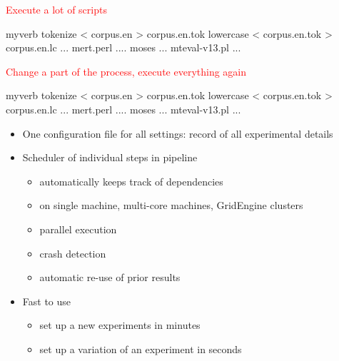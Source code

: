 \documentclass[landscape]{uedslides2C}
\begin{document}

{\small

\begin{center}
\textcolor{red}{Execute a lot of scripts} \\
\begin{SaveVerbatim}{myverb}
tokenize < corpus.en > corpus.en.tok
lowercase < corpus.en.tok > corpus.en.lc
...
mert.perl ....
moses ...
mteval-v13.pl ...
\end{SaveVerbatim}
\colorbox{gray}{}

\vspace{10mm}
\textcolor{red}{Change a part of the process, execute everything again} \\
\begin{SaveVerbatim}{myverb}
tokenize < corpus.en > corpus.en.tok
lowercase < corpus.en.tok > corpus.en.lc
...
mert.perl ....
moses ...
mteval-v13.pl ...
\end{SaveVerbatim}
\colorbox{gray}{}
\end{center}
}

\begin{itemize}
\item One configuration file for all settings: record of all experimental details
\item Scheduler of individual steps in pipeline
\begin{itemize}
\item automatically keeps track of dependencies
\item on single machine, multi-core machines, GridEngine clusters
\item parallel execution 
\item crash detection
\item automatic re-use of prior results
\end{itemize}
\item Fast to use
\begin{itemize}
\item set up a new experiments in minutes
\item set up a variation of an experiment in seconds
\end{itemize}
\end{itemize}

\end{document}
